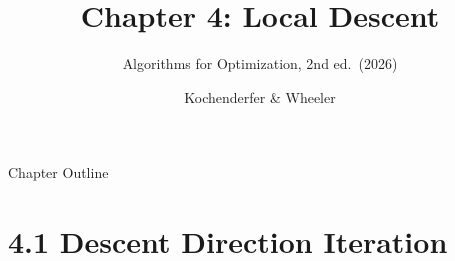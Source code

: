 \documentclass[aspectratio=169,10pt]{beamer}
\title[Ch.4 Local Descent]{Chapter 4: Local Descent}
\subtitle{Algorithms for Optimization, 2nd ed.\ (2026)}
\author{Kochenderfer \& Wheeler}
\institute{MIT Press}
\date{}
\begin{document}

\begin{frame}
  \titlepage
\end{frame}

\begin{frame}{Chapter Outline}
  \tableofcontents
\end{frame}

\section{4.1 Descent Direction Iteration}
\end{document}
